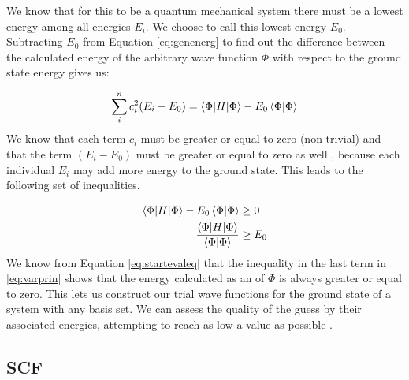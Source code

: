 \documentclass[../master_thesis.tex]{subfiles}
\begin{document}
We know that for this to be a quantum mechanical system there must be a lowest
energy among all energies $E_i$. We choose to call this lowest energy $E_0$.
Subtracting $E_0$ from Equation \ref{eq:genenerg} to find out the difference
between the calculated energy of the arbitrary wave function $\Phi$ with respect
to the ground state energy gives us:

\begin{equation}
   \sum\limits_i^nc_i^2(E_i - E_0) = \braket{\Phi | H | \Phi} -
   E_0\braket{\Phi | \Phi}
\end{equation}
We know that each term $c_i$ must be greater or equal to zero (non-trivial) and
that the term $(E_i - E_0)$ must be greater or equal to zero as well
\cite{Cramer:2004}, because each individual $E_i$ may add more energy to the
ground state. This leads to the following set of inequalities.

\begin{equation}
  \begin{split} \label{eq:varprin}
    \braket{\Phi | H | \Phi} - E_0\braket{\Phi | \Phi} & \geq 0 \\
    \frac{\braket{\Phi | H | \Phi}}{\braket{\Phi | \Phi}} & \geq E_0
  \end{split}
\end{equation}
We know from Equation \ref{eq:startevaleq} that the inequality in the last term in
\ref{eq:varprin} shows that the energy calculated as an \eival of $\Phi$ is
always greater or equal to zero. This lets us construct our trial wave functions
for the ground state of a system with any basis set. We can assess the quality
of the guess by their associated energies, attempting to reach as low a value
as possible \cite{Cramer:2004}.

\subsection{\ac{SCF}}


\biblio
\end{document}

